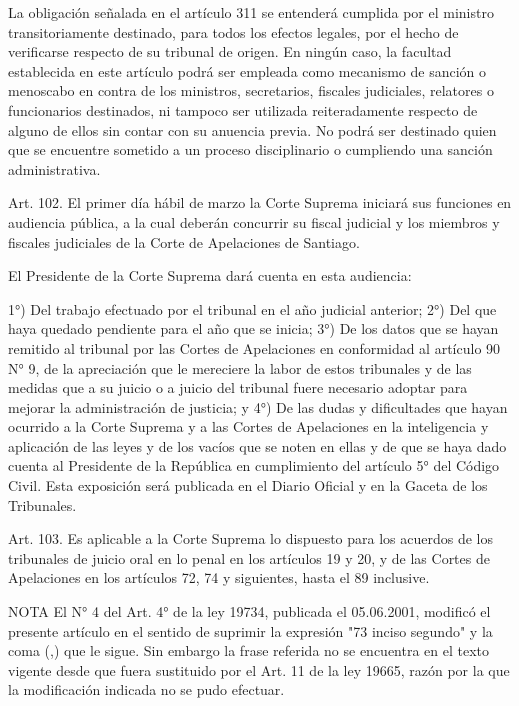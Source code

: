     La obligación señalada en el artículo 311 se entenderá cumplida por el ministro transitoriamente destinado, para todos los efectos legales, por el hecho de verificarse respecto de su tribunal de origen.
    En ningún caso, la facultad establecida en este artículo podrá ser empleada como mecanismo de sanción o menoscabo en contra de los ministros, secretarios, fiscales judiciales, relatores o funcionarios destinados, ni tampoco ser utilizada reiteradamente respecto de alguno de ellos sin contar con su anuencia previa. No podrá ser destinado quien que se encuentre sometido a un proceso disciplinario o cumpliendo una sanción administrativa.

    Art. 102. El primer día hábil de marzo la Corte Suprema iniciará sus funciones en audiencia pública, a la cual deberán concurrir su fiscal judicial y los miembros y fiscales judiciales de la Corte de Apelaciones de Santiago.

    El Presidente de la Corte Suprema dará cuenta en esta audiencia:

    1°) Del trabajo efectuado por el tribunal en el año judicial anterior;
    2°) Del que haya quedado pendiente para el año que se inicia;
    3°) De los datos que se hayan remitido al tribunal por las Cortes de Apelaciones en conformidad al artículo 90 N° 9, de la apreciación que le mereciere la labor de estos tribunales y de las medidas que a su juicio o a juicio del tribunal fuere necesario adoptar para mejorar la administración de justicia; y
    4°) De las dudas y dificultades que hayan ocurrido a la Corte Suprema y a las Cortes de Apelaciones en la inteligencia y aplicación de las leyes y de los vacíos que se noten en ellas y de que se haya dado cuenta al Presidente de la República en cumplimiento del artículo 5° del Código Civil.
    Esta exposición será publicada en el Diario Oficial y en la Gaceta de los Tribunales.


    Art. 103. Es aplicable a la Corte Suprema lo dispuesto para los acuerdos de los tribunales de juicio oral en lo penal en los artículos 19 y 20, y de las Cortes de Apelaciones en los artículos 72, 74 y siguientes, hasta el 89 inclusive.


NOTA
      El N° 4 del Art. 4° de la ley 19734, publicada el 05.06.2001, modificó el presente artículo en el sentido de suprimir la expresión "73 inciso segundo" y la coma (,) que le sigue. Sin embargo la frase referida no se encuentra en el texto vigente desde que fuera sustituido por el Art. 11 de la ley 19665, razón por la que la modificación indicada no se pudo efectuar.

